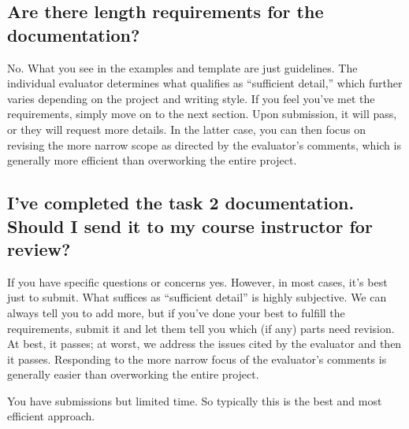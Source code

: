 \documentclass[letterpaper,10pt,english]{jupyterBook}
\begin{document}
\subsection{Are there length requirements for the documentation?}
\label{\detokenize{task1:are-there-length-requirements-for-the-documentation}}
\sphinxAtStartPar
No. What you see in the examples and template are just guidelines. The individual evaluator determines what qualifies as “sufficient detail,” which further varies depending on the project and writing style. If you feel you’ve met the requirements, simply move on to the next section. Upon submission, it will pass, or they will request more details. In the latter case, you can then focus on revising the more narrow scope as directed by the evaluator’s comments, which is generally more efficient than overworking the entire project.


\subsection{I’ve completed the task 2 documentation. Should I send it to my course instructor for review?}
\label{\detokenize{task1:i-ve-completed-the-task-2-documentation-should-i-send-it-to-my-course-instructor-for-review}}
\sphinxAtStartPar
If you have specific questions or concerns \sphinxhyphen{}yes. However, in most cases, it’s best just to submit. What suffices as “sufficient detail” is highly subjective. We can always tell you to add more, but if you’ve done your best to fulfill the requirements, submit it and let them tell you which (if any) parts need revision. At best, it passes; at worst, we address the issues cited by the evaluator \sphinxhyphen{}and then it passes. Responding to the more narrow focus of the evaluator’s comments is generally easier than overworking the entire project.

\sphinxAtStartPar
You have  submissions but limited time. So typically this is the best and most efficient approach.
\end{document}
